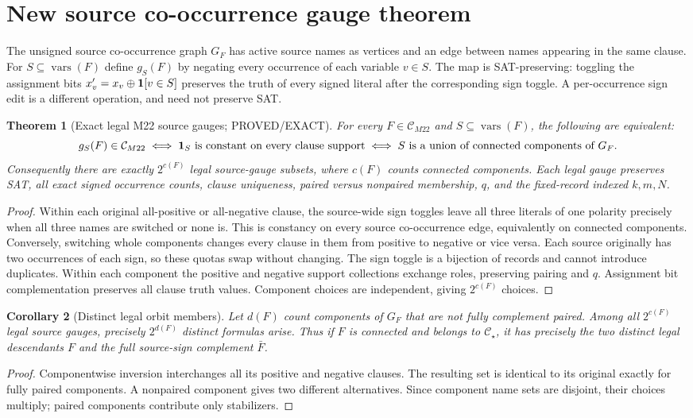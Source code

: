 \documentclass[11pt]{article}
\newtheorem{theorem}{Theorem}
\newtheorem{corollary}[theorem]{Corollary}
\begin{document}
\section{New source co-occurrence gauge theorem}
The unsigned source co-occurrence graph $G_F$ has active source
names as vertices and an edge between names appearing in the same
clause. For $S\subseteq\operatorname{vars}(F)$ define $g_S(F)$
by negating every occurrence of each variable $v\in S$.
The map is SAT-preserving: toggling the assignment bits
$x'_v=x_v\oplus{\bf1}[v\in S]$ preserves the truth
of every signed literal after the corresponding sign toggle.
A per-occurrence sign edit is a different operation,
and need not preserve SAT.

\begin{theorem}[Exact legal M22 source gauges; PROVED/EXACT]
For every $F\in\mathcal C_{M22}$ and $S\subseteq\operatorname{vars}(F)$,
the following are equivalent:
\[
g_S(F)\in\mathcal C_{M22}
\iff {\bf1}_S\text{ is constant on every clause support}
\iff S\text{ is a union of connected components of }G_F.
\]
Consequently there are exactly $2^{c(F)}$ legal source-gauge
subsets, where $c(F)$ counts connected components.
Each legal gauge preserves SAT, all exact signed occurrence
counts, clause uniqueness, paired versus nonpaired membership,
$q$, and the fixed-record indexed $k,m,N$.
\end{theorem}
\begin{proof}
Within each original all-positive or all-negative clause,
the source-wide sign toggles leave all three literals
of one polarity precisely when all three names are
switched or none is. This is constancy on every source
co-occurrence edge, equivalently on connected components.
Conversely, switching whole components changes every
clause in them from positive to negative or vice versa.
Each source originally has two occurrences of each sign,
so these quotas swap without changing. The sign toggle
is a bijection of records and cannot introduce duplicates.
Within each component the positive and negative support
collections exchange roles, preserving pairing and $q$.
Assignment bit complementation preserves all clause
truth values. Component choices are independent,
giving $2^{c(F)}$ choices.
\end{proof}

\begin{corollary}[Distinct legal orbit members]
Let $d(F)$ count components of $G_F$ that are not
fully complement paired. Among all $2^{c(F)}$
legal source gauges, precisely $2^{d(F)}$ distinct
formulas arise. Thus if $F$ is connected and belongs
to $\mathcal C_\star$, it has precisely the two
distinct legal descendants $F$ and the full
source-sign complement $\bar F$.
\end{corollary}
\begin{proof}
Componentwise inversion interchanges all its positive
and negative clauses. The resulting set is identical
to its original exactly for fully paired components.
A nonpaired component gives two different alternatives.
Since component name sets are disjoint, their choices
multiply; paired components contribute only stabilizers.
\end{proof}
\end{document}

